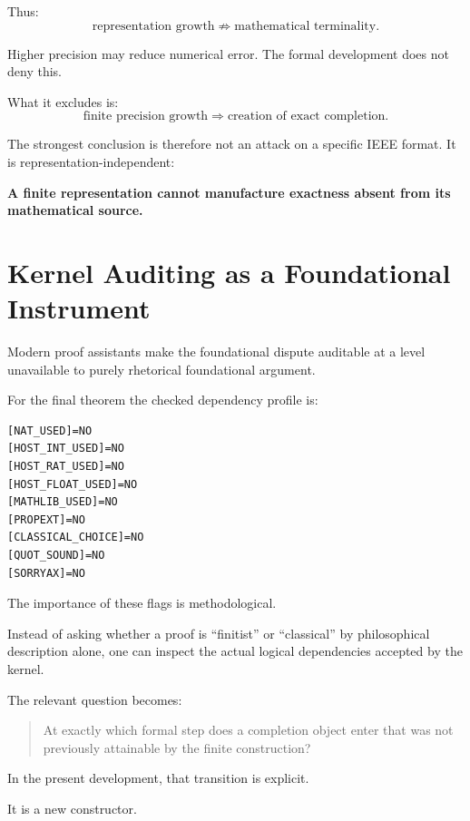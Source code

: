 \documentclass[11pt,a4paper]{article}
\begin{document}
Thus:
\[
\boxed{
\text{representation growth}
\not\Rightarrow
\text{mathematical terminality}.
}
\]

Higher precision may reduce numerical error. The formal development
does not deny this.

What it excludes is:
\[
\boxed{
\text{finite precision growth}
\Rightarrow
\text{creation of exact completion}.
}
\]

The strongest conclusion is therefore not an attack on a specific
IEEE format. It is representation-independent:

\begin{center}
\begin{minipage}{0.82\linewidth}
\centering
\textbf{A finite representation cannot manufacture exactness absent
from its mathematical source.}
\end{minipage}
\end{center}

\section{Kernel Auditing as a Foundational Instrument}

Modern proof assistants make the foundational dispute auditable at a
level unavailable to purely rhetorical foundational argument.

For the final theorem the checked dependency profile is:

\begin{verbatim}
[NAT_USED]=NO
[HOST_INT_USED]=NO
[HOST_RAT_USED]=NO
[HOST_FLOAT_USED]=NO
[MATHLIB_USED]=NO
[PROPEXT]=NO
[CLASSICAL_CHOICE]=NO
[QUOT_SOUND]=NO
[SORRYAX]=NO
\end{verbatim}

The importance of these flags is methodological.

Instead of asking whether a proof is ``finitist'' or ``classical'' by
philosophical description alone, one can inspect the actual logical
dependencies accepted by the kernel.

The relevant question becomes:

\begin{quote}
At exactly which formal step does a completion object enter that was
not previously attainable by the finite construction?
\end{quote}

In the present development, that transition is explicit.

It is a new constructor.
\end{document}
